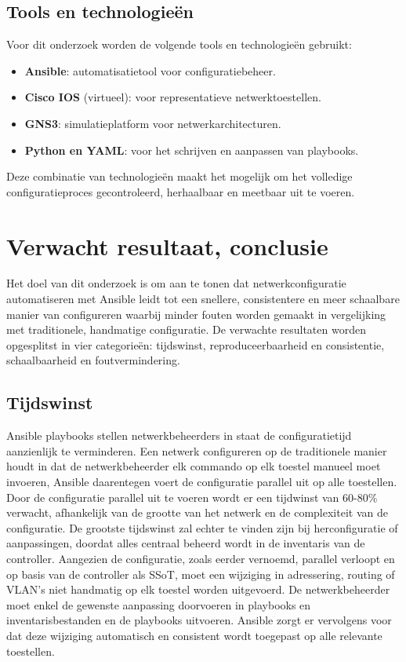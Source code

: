 \subsection{Tools en technologieën}
Voor dit onderzoek worden de volgende tools en technologieën gebruikt:
\begin{itemize}
  \item \textbf{Ansible}: automatisatietool voor configuratiebeheer.
  \item \textbf{Cisco IOS} (virtueel): voor representatieve netwerktoestellen.
  \item \textbf{GNS3}: simulatieplatform voor netwerkarchitecturen.
  \item \textbf{Python en YAML}: voor het schrijven en aanpassen van playbooks.
\end{itemize}
Deze combinatie van technologieën maakt het mogelijk om het volledige configuratieproces gecontroleerd, herhaalbaar en meetbaar uit te voeren.


\section{Verwacht resultaat, conclusie}%
\label{sec:verwachte_resultaten}

Het doel van dit onderzoek is om aan te tonen dat netwerkconfiguratie automatiseren met Ansible leidt tot een snellere, consistentere en meer schaalbare manier van configureren waarbij minder fouten worden gemaakt in vergelijking met traditionele, handmatige configuratie.
De verwachte resultaten worden opgesplitst in vier categorieën: tijdswinst, reproduceerbaarheid en consistentie, schaalbaarheid en foutvermindering.

\subsection{Tijdswinst}

Ansible playbooks stellen netwerkbeheerders in staat de configuratietijd aanzienlijk te verminderen.
Een netwerk configureren op de traditionele manier houdt in dat de netwerkbeheerder elk commando op elk toestel manueel moet invoeren, Ansible daarentegen voert de configuratie parallel uit op alle toestellen.
Door de configuratie parallel uit te voeren wordt er een tijdwinst van 60-80\% verwacht, afhankelijk van de grootte van het netwerk en de complexiteit van de configuratie.
De grootste tijdswinst zal echter te vinden zijn bij herconfiguratie of aanpassingen, doordat alles centraal beheerd wordt in de inventaris van de controller. 
Aangezien de configuratie, zoals eerder vernoemd, parallel verloopt en op basis van de controller als SSoT, moet een wijziging in adressering, routing of VLAN's niet handmatig op elk toestel worden uitgevoerd.
De netwerkbeheerder moet enkel de gewenste aanpassing doorvoeren in playbooks en inventarisbestanden en de playbooks uitvoeren.
Ansible zorgt er vervolgens voor dat deze wijziging automatisch en consistent wordt toegepast op alle relevante toestellen.


